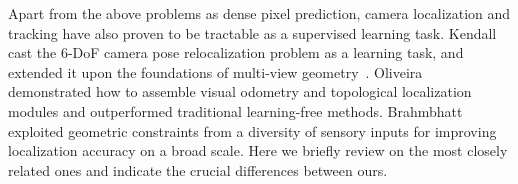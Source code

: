 \documentclass[10pt,twocolumn,letterpaper]{article}
\newcommand{\jpshi}[1]{{{\color{blue} Jianping: #1}}}
\begin{document}
Apart from the above problems as dense pixel prediction, camera localization and tracking have also proven to be tractable as a supervised learning task. Kendall~\etal~\cite{kendall2015convolutional} cast the 6-DoF camera pose relocalization problem as a learning task, and extended it upon the foundations of multi-view geometry~\cite{kendall2017geometric}. Oliveira~\etal~\cite{OliveiraRBB17} demonstrated how to assemble visual odometry and topological localization modules and outperformed traditional learning-free methods. Brahmbhatt~\etal~\cite{MapNet17} exploited geometric constraints from a diversity of sensory inputs for improving localization accuracy on a broad scale.
Here we briefly review on the most closely related ones and indicate the crucial differences between ours. 
\end{document}
